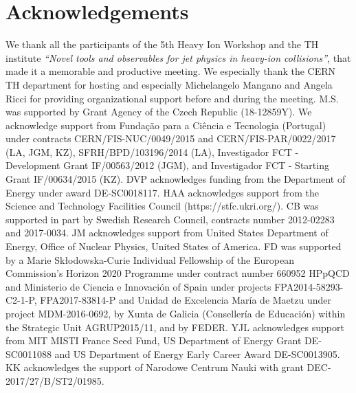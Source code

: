 \documentclass[10pt,a4paper]{article}
\begin{document}
\section*{Acknowledgements} 
We thank all the participants of the 5th Heavy Ion Workshop and the TH institute {\sl ``Novel tools and observables for jet physics in heavy-ion collisions''}, that made it a memorable and productive meeting.
We especially thank the CERN TH department for hosting and especially Michelangelo Mangano and Angela Ricci for providing organizational support before and during the meeting.
M.S. was supported by Grant Agency of the Czech Republic (18-12859Y).
We acknowledge support from  Funda{\c c}{\~ a}o para a Ci{\^ e}ncia e Tecnologia (Portugal) under contracts CERN/FIS-NUC/0049/2015 and CERN/FIS-PAR/0022/2017 (LA, JGM, KZ), SFRH/BPD/103196/2014 (LA),  Investigador FCT - Development Grant IF/00563/2012 (JGM), and Investigador FCT - Starting Grant IF/00634/2015 (KZ).
DVP acknowledges funding from the Department of Energy under award DE-SC0018117.
HAA acknowledges support from the Science and Technology Facilities Council (https://stfc.ukri.org/).
CB was supported in part by Swedish Research Council, contracts number 2012-02283 and 2017-0034.
JM acknowledges support from United States Department of Energy, Office of Nuclear Physics, United States of America.
FD was supported by a Marie Sk\l{}odowska-Curie Individual Fellowship of the European Commission's Horizon 2020 Programme under contract number 660952 HPpQCD and Ministerio de Ciencia e Innovaci{\' o}n of Spain under projects FPA2014-58293-C2-1-P, FPA2017-83814-P and Unidad de Excelencia Mar{\' i}a de Maetzu under project MDM-2016-0692, by Xunta de Galicia (Conseller{\' i}a de Educaci{\' o}n) within the Strategic Unit AGRUP2015/11, and by FEDER.
YJL acknowledges support from MIT MISTI France Seed Fund, US Department of Energy Grant DE-SC0011088 and US Department of Energy Early Career Award DE-SC0013905.
KK acknowledges the support of Narodowe Centrum Nauki with grant DEC-2017/27/B/ST2/01985.

\appendix






\end{document}
